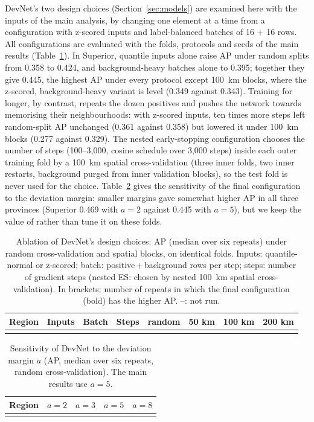 \documentclass[pdflatex,sn-apa]{sn-jnl}
\begin{document}
\begin{appendices}
DevNet's two design choices (Section~\ref{sec:models}) are examined here with the inputs of the main analysis, by changing one element at a time from a configuration with z-scored inputs and label-balanced batches of 16 + 16 rows. All configurations are evaluated with the folds, protocols and seeds of the main results (Table~\ref{tab:ablation}). In Superior, quantile inputs alone raise AP under random splits from 0.358 to 0.424, and background-heavy batches alone to 0.395; together they give 0.445, the highest AP under every protocol except 100~km blocks, where the z-scored, background-heavy variant is level (0.349 against 0.343). Training for longer, by contrast, repeats the dozen positives and pushes the network towards memorising their neighbourhoods: with z-scored inputs, ten times more steps left random-split AP unchanged (0.361 against 0.358) but lowered it under 100~km blocks (0.277 against 0.329). The nested early-stopping configuration chooses the number of steps (100--3,000, cosine schedule over 3,000 steps) inside each outer training fold by a 100~km spatial cross-validation (three inner folds, two inner restarts, background purged from inner validation blocks), so the test fold is never used for the choice. Table~\ref{tab:margin} gives the sensitivity of the final configuration to the deviation margin: smaller margins gave somewhat higher AP in all three provinces (Superior 0.469 with $a = 2$ against 0.445 with $a = 5$), but we keep the value of \citet{Pang2019} rather than tune it on these folds.

\begin{table}[!h]
\caption{Ablation of DevNet's design choices: AP (median over six repeats) under random cross-validation and spatial blocks, on identical folds. Inputs: quantile-normal or z-scored; batch: positive\,+\,background rows per step; steps: number of gradient steps (nested ES: chosen by nested 100~km spatial cross-validation). In brackets: number of repeats in which the final configuration (bold) has the higher AP. --: not run.}\label{tab:ablation}
\scriptsize
\setlength{\tabcolsep}{2.5pt}
\begin{tabular*}{\textwidth}{@{\extracolsep\fill}llllllll}
\toprule
Region & Inputs & Batch & Steps & random & 50 km & 100 km & 200 km \\
\midrule
\botrule
\end{tabular*}
\end{table}

\begin{table}[!h]
\caption{Sensitivity of DevNet to the deviation margin $a$ (AP, median over six repeats, random cross-validation). The main results use $a = 5$.}\label{tab:margin}
\footnotesize
\begin{tabular*}{0.7\textwidth}{@{\extracolsep\fill}lcccc}
\toprule
Region & $a = 2$ & $a = 3$ & $a = 5$ & $a = 8$ \\
\midrule
\botrule
\end{tabular*}
\end{table}

\end{appendices}

\clearpage


\end{document}
